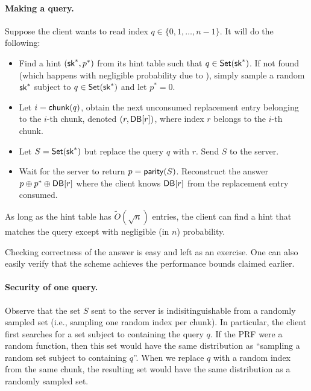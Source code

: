 \paragraph{Making a query.}
Suppose the client wants to read index
$q \in \{0, 1, \ldots, n-1\}$.
It will do the following: 
\begin{itemize}
\item 
Find a hint $({\sf sk}^*, p^*)$
from its hint table such that $q \in {\sf Set}({\sf sk}^*)$.
If not found (which happens
with negligible probability due to ), 
simply sample a random ${\sf sk}^*$ subject to $q \in {\sf Set}({\sf sk}^*)$ and let $p^* =0$.
\item 
Let $i = {\sf chunk}(q)$, obtain the next unconsumed
replacement entry belonging to the $i$-th chunk, denoted $(r, {\sf DB}[r])$,
where index $r$ belongs
to the $i$-th chunk.
\item 
Let $S = {\sf Set}({\sf sk}^*)$ but 
replace the query $q$ with $r$. 
Send $S$ to the server. 
\item 
Wait for the server to return 
$p = {\sf parity}(S)$.
Reconstruct the answer $p \oplus p^* \oplus {\sf DB}[r]$ where the client knows ${\sf DB}[r]$
from the replacement entry consumed.
\end{itemize}

\begin{claim}
As long as the hint table has $\widetilde{O}(\sqrt{n})$ entries,
the client can find a hint that matches the query except with negligible (in $n$)
probability.  
\label{clm:correct}
\end{claim}

Checking correctness of the answer is easy and left as an exercise.
One can also easily verify that the scheme achieves the performance
bounds claimed earlier.



\paragraph{Security of one query.}
Observe that the set $S$ sent to the server is indisitinguishable
from a randomly sampled set (i.e., sampling one random index per chunk).  
In particular, the client first searches for a set subject to containing the query $q$.
If the PRF were a random function, then this set would have the same distribution as
``sampling a random set subject to 
containing $q$''.
When we replace $q$ with 
a random index from the same chunk, the resulting set
would have the same distribution as a randomly sampled set.

